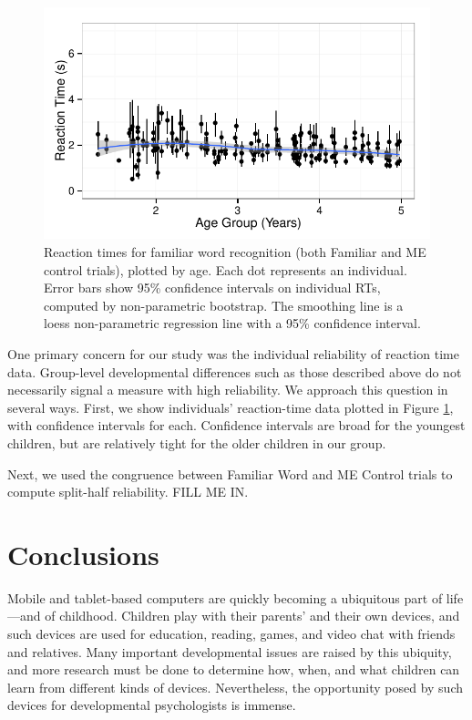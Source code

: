 \documentclass[man,noapacite]{apa2}
\begin{document}
\begin{figure}[t] 
  \begin{center} 
    \includegraphics[width=5in]{figures/individuals.pdf} 
    \caption{\label{fig:rt2} Reaction times for familiar word recognition (both Familiar and ME control trials), plotted by age. Each dot represents an individual. Error bars show 95\% confidence intervals on individual RTs, computed by non-parametric bootstrap. The smoothing line is a loess non-parametric regression line with a 95\% confidence interval.}
  \end{center} 
\end{figure}

One primary concern for our study was the individual reliability of reaction time data. Group-level developmental differences such as those described above do not necessarily signal a measure with high reliability. We approach this question in several ways. First, we show individuals' reaction-time data plotted in Figure \ref{fig:rt2}, with confidence intervals for each. Confidence intervals are broad for the youngest children, but are relatively tight for the older children in our group. 

Next, we used the congruence between Familiar Word and ME Control trials to compute split-half reliability. FILL ME IN. 

\section{Conclusions} 

Mobile and tablet-based computers are quickly becoming a ubiquitous part of life---and of childhood. Children play with their parents' and their own devices, and such devices are used for education, reading, games, and video chat with friends and relatives. Many important developmental issues are raised by this ubiquity, and more research must be done to determine how, when, and what children can learn from different kinds of devices. Nevertheless, the opportunity posed by such devices for developmental psychologists is immense.
\end{document}
